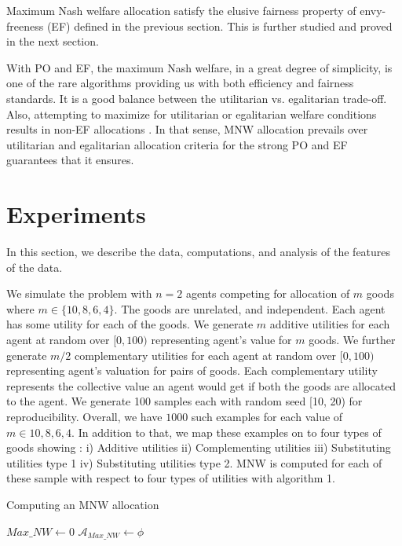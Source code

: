 Maximum Nash welfare allocation satisfy the elusive fairness property of envy-freeness (EF) defined in the previous section. This is further studied and proved in the next section.

With PO and EF, the maximum Nash welfare, in a great degree of simplicity, is one of the rare algorithms providing us with both efficiency and fairness standards. It is a good balance between the utilitarian vs. egalitarian trade-off. Also, attempting to maximize for utilitarian or egalitarian welfare conditions results in non-EF allocations \cite{caragiannis2016unreasonable}. In that sense, MNW allocation prevails over utilitarian and egalitarian allocation criteria for the strong PO and EF guarantees that it ensures.

\section{Experiments}
\label{section_experiments}
In this section, we describe the data, computations, and analysis of the features of the data.

We simulate the problem with $n = 2$ agents competing for allocation of $m$ goods where $m \in \{10, 8, 6, 4\}$. The goods are unrelated, and independent. Each agent has some utility for each of the goods. We generate $m$ additive utilities for each agent at random over $[0, 100)$ representing agent's value for $m$ goods. We further generate $m/2$ complementary utilities for each agent at random over $[0, 100)$ representing agent's valuation for pairs of goods. Each complementary utility represents the collective value an agent would get if both the goods are allocated to the agent. We generate 100 samples each with random seed [10, 20) for reproducibility. Overall, we have $1000$ such examples for each value of $m \in {10, 8, 6, 4}$. In addition to that, we map these examples on to four types of goods showing : i) Additive utilities ii) Complementing utilities iii) Substituting utilities type 1 iv) Substituting utilities type 2.  MNW is computed for each of these sample with respect to four types of utilities with algorithm 1.

\BlankLine

\begin{algorithm}
\caption{ Computing an MNW allocation }
\SetAlgoLined
{}
 $Max\_NW \leftarrow 0 $ \;
 $\mathcal{A}_{Max\_NW} \leftarrow \phi $ \;
\end{algorithm}

